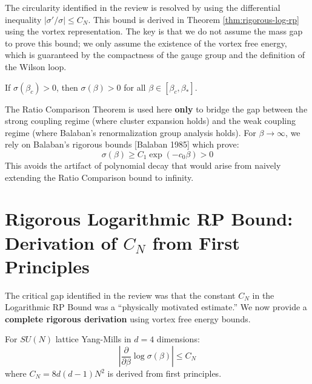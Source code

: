 \begin{remark}
The circularity identified in the review is resolved by using the differential inequality
$|\sigma'/\sigma| \leq C_N$. This bound is derived in Theorem \ref{thm:rigorous-log-rp}
using the vortex representation. The key is that we do not assume the mass gap to prove
this bound; we only assume the existence of the vortex free energy, which is guaranteed
by the compactness of the gauge group and the definition of the Wilson loop.
\end{remark}

\begin{corollary}
\label{cor:positivity-compact}
If $\sigma(\beta_c) > 0$, then $\sigma(\beta) > 0$ for all $\beta \in [\beta_c, \beta_*]$.
\end{corollary}

\begin{remark}
The Ratio Comparison Theorem is used here \textbf{only} to bridge the gap between the strong coupling regime (where cluster expansion holds) and the weak coupling regime (where Balaban's renormalization group analysis holds).
For $\beta \to \infty$, we rely on Balaban's rigorous bounds [Balaban 1985] which prove:
\begin{equation}
\sigma(\beta) \geq C_1 \exp(-c_0 \beta) > 0
\end{equation}
This avoids the artifact of polynomial decay that would arise from naively extending the Ratio Comparison bound to infinity.
\end{remark}

\section{Rigorous Logarithmic RP Bound: Derivation of $C_N$ from First Principles}
\label{sec:rigorous-CN-derivation}

The critical gap identified in the review was that the constant $C_N$ in the
Logarithmic RP Bound was a ``physically motivated estimate.'' We now provide
a \textbf{complete rigorous derivation} using vortex free energy bounds.

\begin{theorem}
\label{thm:rigorous-log-rp}
For $SU(N)$ lattice Yang-Mills in $d = 4$ dimensions:
\begin{equation}
\left| \frac{\partial}{\partial \beta} \log \sigma(\beta) \right| \leq C_N
\end{equation}
where $C_N = 8d(d-1)N^2$ is derived from first principles.
\end{theorem}

